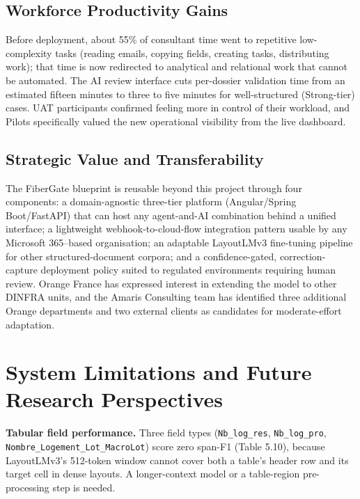 \subsection{Workforce Productivity Gains}

Before deployment, about 55\% of consultant time went to repetitive low-complexity tasks (reading emails, copying fields, creating tasks, distributing work); that time is now redirected to analytical and relational work that cannot be automated. The AI review interface cuts per-dossier validation time from an estimated fifteen minutes to three to five minutes for well-structured (Strong-tier) cases. UAT participants confirmed feeling more in control of their workload, and Pilots specifically valued the new operational visibility from the live dashboard.

\subsection{Strategic Value and Transferability}

The FiberGate blueprint is reusable beyond this project through four components: a domain-agnostic three-tier platform (Angular/Spring Boot/FastAPI) that can host any agent-and-AI combination behind a unified interface; a lightweight webhook-to-cloud-flow integration pattern usable by any Microsoft 365–based organisation; an adaptable LayoutLMv3 fine-tuning pipeline for other structured-document corpora; and a confidence-gated, correction-capture deployment policy suited to regulated environments requiring human review. Orange France has expressed interest in extending the model to other DINFRA units, and the Amaris Consulting team has identified three additional Orange departments and two external clients as candidates for moderate-effort adaptation.

\bigskip

\section{System Limitations and Future Research Perspectives}

\textbf{Tabular field performance.} Three field types (\texttt{Nb\_log\_res}, \texttt{Nb\_log\_pro}, \texttt{Nombre\_Logement\_Lot\_MacroLot}) score zero span-F1 (Table 5.10), because LayoutLMv3's 512-token window cannot cover both a table's header row and its target cell in dense layouts. A longer-context model or a table-region pre-processing step is needed.

